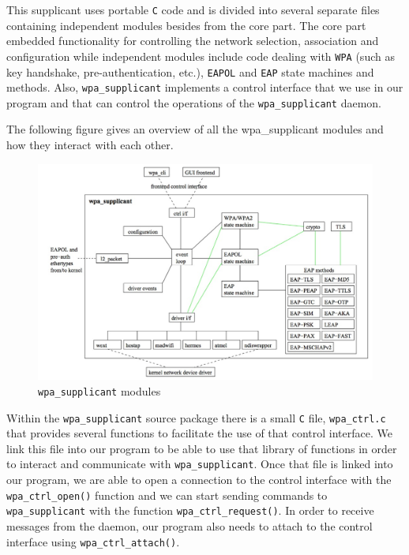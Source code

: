  This supplicant uses portable \texttt{C} code and is divided into several separate files containing independent modules besides from the core part. The core part embedded functionality for controlling the network selection, association and configuration while independent modules include code dealing with \texttt{WPA} (such as key handshake, pre-authentication, etc.), \texttt{EAPOL} and \texttt{EAP} state machines and methods. Also, \texttt{wpa\_supplicant} implements a control interface that we use in our program and that can control the operations of the \texttt{wpa\_supplicant} daemon.

The following figure gives an overview of all the wpa\_supplicant modules and how they interact with each other.

 \begin{figure}[H]
 	\begin{center}
		\includegraphics[width=1\linewidth]{Pictures/chapter4/wpa-supplicant-modules.jpg}
		\caption{\texttt{wpa\_supplicant} modules}
	\end{center}
\end{figure}

Within the \texttt{wpa\_supplicant} source package there is a small \texttt{C} file, \texttt{wpa\_ctrl.c} that provides several functions to facilitate the use of that control interface. We link this file into our program to be able to use that library of functions in order to interact and communicate with \texttt{wpa\_supplicant}. Once that file is linked into our program, we are able to open a connection to the control interface with the \texttt{wpa\_ctrl\_open()} function and we can start sending commands to \texttt{wpa\_supplicant} with the function \texttt{wpa\_ctrl\_request()}. In order to receive messages from the daemon, our program also needs to attach to the control interface using \texttt{wpa\_ctrl\_attach()}.

